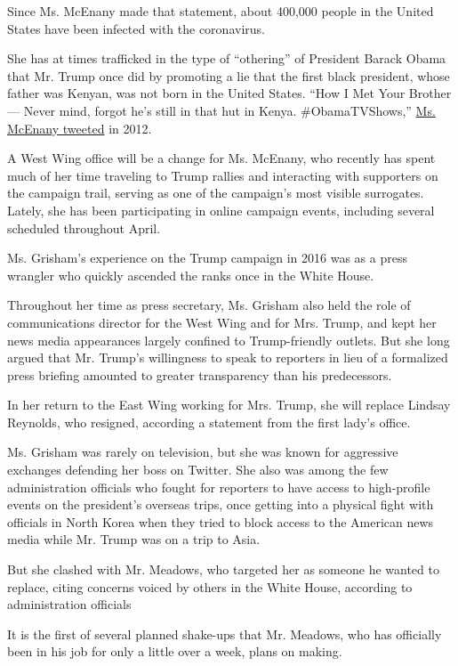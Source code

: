 Since Ms. McEnany made that statement, about 400,000 people in the
United States have been infected with the coronavirus.

She has at times trafficked in the type of ``othering'' of President
Barack Obama that Mr. Trump once did by promoting a lie that the first
black president, whose father was Kenyan, was not born in the United
States. ``How I Met Your Brother --- Never mind, forgot he's still in
that hut in Kenya. \#ObamaTVShows,''
\href{https://twitter.com/kayleighmcenany/status/240993516443037698}{Ms.
McEnany tweeted} in 2012.

A West Wing office will be a change for Ms. McEnany, who recently has
spent much of her time traveling to Trump rallies and interacting with
supporters on the campaign trail, serving as one of the campaign's most
visible surrogates. Lately, she has been participating in online
campaign events, including several scheduled throughout April.

Ms. Grisham's experience on the Trump campaign in 2016 was as a press
wrangler who quickly ascended the ranks once in the White House.

Throughout her time as press secretary, Ms. Grisham also held the role
of communications director for the West Wing and for Mrs. Trump, and
kept her news media appearances largely confined to Trump-friendly
outlets. But she long argued that Mr. Trump's willingness to speak to
reporters in lieu of a formalized press briefing amounted to greater
transparency than his predecessors.

In her return to the East Wing working for Mrs. Trump, she will replace
Lindsay Reynolds, who resigned, according a statement from the first
lady's office.

Ms. Grisham was rarely on television, but she was known for aggressive
exchanges defending her boss on Twitter. She also was among the few
administration officials who fought for reporters to have access to
high-profile events on the president's overseas trips, once getting into
a physical fight with officials in North Korea when they tried to block
access to the American news media while Mr. Trump was on a trip to Asia.

But she clashed with Mr. Meadows, who targeted her as someone he wanted
to replace, citing concerns voiced by others in the White House,
according to administration officials

It is the first of several planned shake-ups that Mr. Meadows, who has
officially been in his job for only a little over a week, plans on
making.

